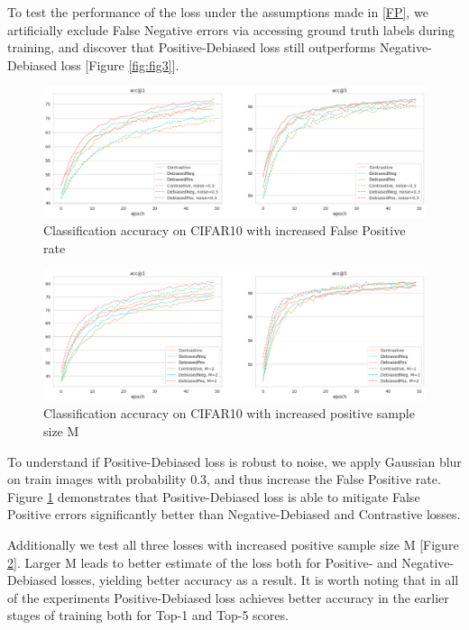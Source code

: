 \documentclass{article}
\begin{document}
To test the performance of the loss under the assumptions made in \ref{FP}, we artificially exclude False Negative errors via accessing ground truth labels during training, and discover that Positive-Debiased loss still outperforms Negative-Debiased loss [Figure \ref{fig:fig3}].

\begin{figure}
\includegraphics[width=1\textwidth]{figures/base_vs_noise.png}
\caption{Classification accuracy on CIFAR10 with increased False Positive rate}
\label{fig:fig4}
\end{figure}

\begin{figure}
\includegraphics[width=1\textwidth]{figures/base_vs_M=2.png}
\caption{Classification accuracy on CIFAR10 with increased positive sample size M}
\label{fig:fig5}
\end{figure}

To understand if Positive-Debiased loss is robust to noise, we apply Gaussian blur on train images with probability 0.3, and thus increase the False Positive rate. Figure \ref{fig:fig4} demonstrates that Positive-Debiased loss is able to mitigate False Positive errors significantly better than Negative-Debiased and Contrastive losses.


Additionally we test all three losses with increased positive sample size M [Figure \ref{fig:fig5}]. Larger M leads to better estimate of the loss both for Positive- and Negative-Debiased losses, yielding better accuracy as a result. It is worth noting that in all of the experiments Positive-Debiased loss achieves better accuracy in the earlier stages of training both for Top-1 and Top-5 scores.
\end{document}
